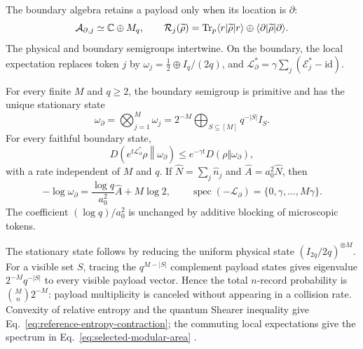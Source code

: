 The boundary algebra retains a payload only when its location is
\(\partial\):
\begin{equation}
 \mathcal A_{\partial,j}\simeq\mathbb C\oplus M_q,\qquad
 \mathcal R_j(\widetilde\rho)
 =\operatorname{Tr}_p\langle r|\widetilde\rho|r\rangle
 \oplus\langle\partial|\widetilde\rho|\partial\rangle .
 \label{eq:reference-readout}
\end{equation}
The physical and boundary semigroups intertwine.  On the boundary, the local
expectation replaces token \(j\) by
\(\omega_j=\frac12\oplus I_q/(2q)\), and
\(\mathcal L_\partial^*=\gamma\sum_j(\mathcal E_j^*-\mathrm{id})\).

\begin{theorem}
\label{thm:capacity-reference-selection}
For every finite \(M\) and \(q\ge2\), the boundary semigroup is primitive and
has the unique stationary state
\begin{equation}
 \omega_\partial
 =\bigotimes_{j=1}^{M}\omega_j
 =2^{-M}\bigoplus_{S\subseteq[M]}q^{-|S|}I_S .
 \label{eq:selected-capacity-reference}
\end{equation}
For every faithful boundary state,
\begin{equation}
 D\!\left(e^{t\mathcal L_\partial^*}\rho\middle\Vert\omega_\partial\right)
 \le e^{-\gamma t}D(\rho\Vert\omega_\partial),
 \label{eq:reference-entropy-contraction}
\end{equation}
with a rate independent of \(M\) and \(q\).  If
\(\widehat N=\sum_j\widehat n_j\) and
\(\widehat A=a_0^2\widehat N\), then
\begin{equation}
 -\log\omega_\partial
 =\frac{\log q}{a_0^2}\widehat A+M\log2 ,
 \qquad
 \operatorname{spec}(-\mathcal L_\partial)
 =\{0,\gamma,\ldots,M\gamma\}.
 \label{eq:selected-modular-area}
\end{equation}
The coefficient \((\log q)/a_0^2\) is unchanged by additive blocking of
microscopic tokens.
\end{theorem}

The stationary state follows by reducing the uniform physical state
\((I_{2q}/2q)^{\otimes M}\).  For a visible set \(S\), tracing the
\(q^{M-|S|}\) complement payload states gives eigenvalue
\(2^{-M}q^{-|S|}\) to every visible payload vector.  Hence the total
\(n\)-record probability is
\(\binom{M}{n}2^{-M}\): payload multiplicity is canceled without appearing
in a collision rate.  Convexity of relative entropy and the quantum Shearer
inequality give Eq.~\eqref{eq:reference-entropy-contraction}; the commuting
local expectations give the spectrum in
Eq.~\eqref{eq:selected-modular-area}
\cite{MullerHermes2016,Capel2021,Dong2026}.

